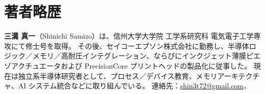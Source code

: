 \documentclass[conference]{IEEEtran}
\begin{document}
\section*{著者略歴}
\noindent\textbf{三溝 真一}（Shinichi Samizo）は、信州大学大学院 工学系研究科 電気電子工学専攻にて修士号を取得。
その後、セイコーエプソン株式会社に勤務し、半導体ロジック／メモリ／高耐圧インテグレーション、ならびにインクジェット薄膜ピエゾアクチュエータおよび PrecisionCore プリントヘッドの製品化に従事した。
現在は独立系半導体研究者として、プロセス／デバイス教育、メモリアーキテクチャ、AI システム統合などに取り組んでいる。
連絡先：\href{mailto:shin3t72@gmail.com}{shin3t72@gmail.com}．



\end{document}
